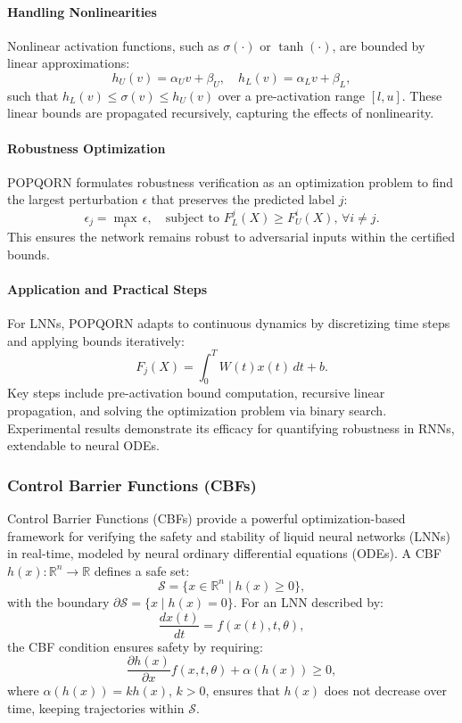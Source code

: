 \paragraph{Handling Nonlinearities}
Nonlinear activation functions, such as \(\sigma(\cdot)\) or \(\tanh(\cdot)\), are bounded by linear approximations:
\[
h_U(v) = \alpha_U v + \beta_U, \quad h_L(v) = \alpha_L v + \beta_L,
\]
such that \(h_L(v) \leq \sigma(v) \leq h_U(v)\) over a pre-activation range \([l, u]\). These linear bounds are propagated recursively, capturing the effects of nonlinearity.

\paragraph{Robustness Optimization}
POPQORN formulates robustness verification as an optimization problem to find the largest perturbation \(\epsilon\) that preserves the predicted label \(j\):
\[
\epsilon_j = \max_\epsilon \, \epsilon, \quad \text{subject to } F_L^j(X) \geq F_U^i(X), \, \forall i \neq j.
\]
This ensures the network remains robust to adversarial inputs within the certified bounds.

\paragraph{Application and Practical Steps}
For LNNs, POPQORN adapts to continuous dynamics by discretizing time steps and applying bounds iteratively:
\[
F_j(X) = \int_0^T W(t)x(t) \, dt + b.
\]
Key steps include pre-activation bound computation, recursive linear propagation, and solving the optimization problem via binary search. Experimental results demonstrate its efficacy for quantifying robustness in RNNs, extendable to neural ODEs. \cite{koPOPQORNQuantifyingRobustness2019}

\subsubsection{Control Barrier Functions (CBFs)}

Control Barrier Functions (CBFs) provide a powerful optimization-based framework for verifying the safety and stability of liquid neural networks (LNNs) in real-time, modeled by neural ordinary differential equations (ODEs). A CBF \(h(x): \mathbb{R}^n \to \mathbb{R}\) defines a safe set:
\[
\mathcal{S} = \{x \in \mathbb{R}^n \mid h(x) \geq 0\},
\]
with the boundary \(\partial \mathcal{S} = \{x \mid h(x) = 0\}\). For an LNN described by:
\[
\frac{dx(t)}{dt} = f(x(t), t, \theta),
\]
the CBF condition ensures safety by requiring:
\[
\frac{\partial h(x)}{\partial x} f(x, t, \theta) + \alpha(h(x)) \geq 0,
\]
where \(\alpha(h(x)) = kh(x)\), \(k > 0\), ensures that \(h(x)\) does not decrease over time, keeping trajectories within \(\mathcal{S}\).

